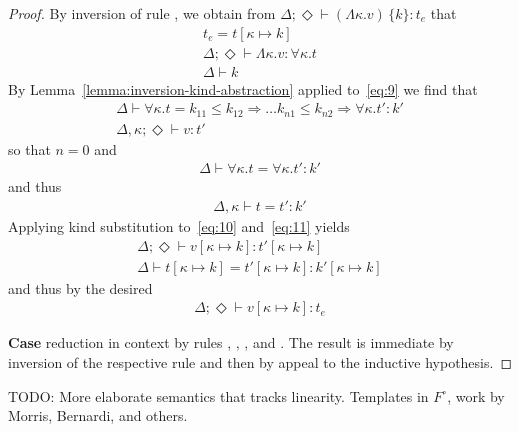 \documentclass{article}
\newcommand{\KVAR}{\kappa}
\newcommand{\ONE}{\circ}
\newcommand{\KALL}[1]{\forall#1.}
\newcommand{\KLAM}[1]{\Lambda#1.}
\newcommand{\KAPP}[2]{#1\,\{#2\}}
\newcommand{\KENV}{\Delta}
\newcommand{\TENVEMPTY}{\Diamond}
\begin{document}
\begin{proof}
  By inversion of rule , we obtain from
  $\KENV; \TENVEMPTY \vdash \KAPP{(\KLAM \KVAR v)}k : t_e$ that
  \begin{gather}
    t_e =  t[\KVAR \mapsto k] \\
    \label{eq:9}
    \KENV; \TENVEMPTY \vdash \KLAM \KVAR v : \KALL\KVAR t \\
    \KENV \vdash k
  \end{gather}
  By Lemma~\ref{lemma:inversion-kind-abstraction} applied to~\eqref{eq:9} we find that
  \begin{gather}
    \KENV \vdash
    \KALL\KVAR t
    = k_{11}\le k_{12}\Rightarrow \dots k_{n1}\le k_{n2} \Rightarrow
    \KALL \KVAR t' : k'     \\
    \label{eq:10}
    \KENV, \KVAR; \TENVEMPTY \vdash v : t'
  \end{gather}
  so that $n=0$ and
  \begin{gather}
    \KENV \vdash
    \KALL\KVAR t
    = 
    \KALL \KVAR t' : k'
  \end{gather}
  and thus
  \begin{gather}\label{eq:11}
    \KENV, \KVAR \vdash
    t
    = 
    t' : k'
  \end{gather}
  Applying kind substitution to~\eqref{eq:10} and~\eqref{eq:11} yields
  \begin{gather}
    \KENV; \TENVEMPTY \vdash v[\KVAR \mapsto k] : t'[\KVAR \mapsto k]
    \\
    \KENV \vdash
    t[\KVAR \mapsto k]
    = 
    t'[\KVAR \mapsto k] : k'[\KVAR \mapsto k]
  \end{gather}
  and thus by  the desired
  \begin{gather}
    \KENV; \TENVEMPTY \vdash v[\KVAR \mapsto k] : t_e
  \end{gather}

  \textbf{Case} reduction in context by rules ,
  , , and . The result is
  immediate by inversion of the respective rule and then by appeal to the inductive hypothesis.
\end{proof}

TODO: More elaborate semantics that tracks linearity.
Templates in $F^{\ONE}$, work by Morris, Bernardi, and others.
\end{document}
